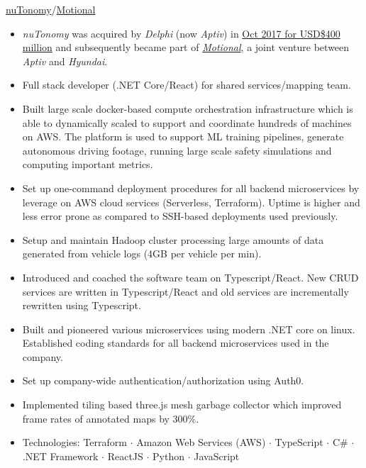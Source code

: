 \documentclass[]{cv} %
\begin{document}

\entry
{\href{https://en.wikipedia.org/wiki/NuTonomy}{nuTonomy}/\href{https://www.aptiv.com/solutions/autonomous-mobility}{Motional}}
{
\vspace{-\belowdisplayshortskip}
\begin{itemize}
\item \emph{nuTonomy} was acquired by \emph{Delphi} (now \emph{Aptiv}) in \href{https://techcrunch.com/2017/10/24/delphi-buys-nutonomy-for-400-million-to-scale-and-deliver-autonomous-vehicles/}{Oct 2017 for USD\$400 million} and subsequently became part of \href{https://www.aptiv.com/solutions/autonomous-mobility}{\emph{Motional}}, a joint venture between \emph{Aptiv} and \emph{Hyundai}.
\item Full stack developer (.NET Core/React) for shared services/mapping team.
\item Built large scale docker-based compute orchestration infrastructure which is able to dynamically scaled to support and coordinate hundreds of machines on AWS. The platform is used to support ML training pipelines, generate autonomous driving footage, running large scale safety simulations and computing important metrics.
\item Set up one-command deployment procedures for all backend microservices by leverage on AWS cloud services (Serverless, Terraform). Uptime is higher and less error prone as compared to SSH-based deployments used previously.
\item Setup and maintain Hadoop cluster processing large amounts of data generated from vehicle logs (4GB per vehicle per min).
\item Introduced and coached the software team on Typescript/React. New CRUD services are written in Typescript/React and old services are incrementally rewritten using Typescript.
\item Built and pioneered various microservices using modern .NET core on linux. Established coding standards for all backend microservices used in the company.
\item Set up company-wide authentication/authorization using Auth0.
\item Implemented tiling based three.js mesh garbage collector which improved frame rates of annotated maps by 300\%.
\item Technologies: Terraform $\cdot$ Amazon Web Services (AWS) $\cdot$ TypeScript $\cdot$ C\# $\cdot$ .NET Framework $\cdot$ ReactJS $\cdot$ Python $\cdot$ JavaScript
\end{itemize}
}
\end{document}
